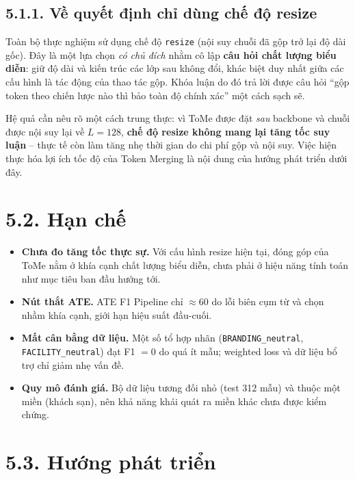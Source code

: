 \subsection{5.1.1. Về quyết định chỉ dùng chế độ resize}
\label{subsec:kl_resize}

Toàn bộ thực nghiệm sử dụng chế độ \texttt{resize} (nội suy chuỗi đã gộp
trở lại độ dài gốc). Đây là một lựa chọn \emph{có chủ đích} nhằm cô lập
\textbf{câu hỏi chất lượng biểu diễn}: giữ độ dài và kiến trúc các lớp sau
không đổi, khác biệt duy nhất giữa các cấu hình là tác động của thao tác
gộp. Khóa luận do đó trả lời được câu hỏi ``gộp token theo chiến lược nào
thì bảo toàn độ chính xác'' một cách sạch sẽ.

Hệ quả cần nêu rõ một cách trung thực: vì ToMe được đặt \emph{sau}
backbone và chuỗi được nội suy lại về $L = 128$, \textbf{chế độ resize
không mang lại tăng tốc suy luận} -- thực tế còn làm tăng nhẹ thời gian do
chi phí gộp và nội suy. Việc hiện thực hóa lợi ích tốc độ của Token
Merging là nội dung của hướng phát triển dưới đây.

\section{5.2. Hạn chế}
\label{sec:kl_hanche}

\begin{itemize}
  \item \textbf{Chưa đo tăng tốc thực sự.} Với cấu hình resize hiện tại,
        đóng góp của ToMe nằm ở khía cạnh chất lượng biểu diễn, chưa phải
        ở hiệu năng tính toán như mục tiêu ban đầu hướng tới.
  \item \textbf{Nút thắt ATE.} ATE F1 Pipeline chỉ $\approx 60$ do lỗi
        biên cụm từ và chọn nhầm khía cạnh, giới hạn hiệu suất đầu-cuối.
  \item \textbf{Mất cân bằng dữ liệu.} Một số tổ hợp nhãn
        (\texttt{BRANDING\_neutral}, \texttt{FACILITY\_neutral}) đạt
        F1 $= 0$ do quá ít mẫu; weighted loss và dữ liệu bổ trợ chỉ giảm
        nhẹ vấn đề.
  \item \textbf{Quy mô đánh giá.} Bộ dữ liệu tương đối nhỏ (test 312 mẫu)
        và thuộc một miền (khách sạn), nên khả năng khái quát ra miền khác
        chưa được kiểm chứng.
\end{itemize}

\section{5.3. Hướng phát triển}
\label{sec:kl_huongphattrien}

